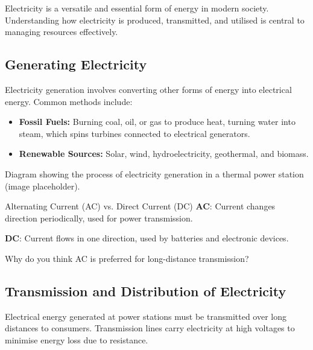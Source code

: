 Electricity is a versatile and essential form of energy in modern society. Understanding how electricity is produced, transmitted, and utilised is central to managing resources effectively.

\subsection{Generating Electricity}

Electricity generation involves converting other forms of energy into electrical energy. Common methods include:

\begin{itemize}
    \item \textbf{Fossil Fuels:} Burning coal, oil, or gas to produce heat, turning water into steam, which spins turbines connected to electrical generators.
    \item \textbf{Renewable Sources:} Solar, wind, hydroelectricity, geothermal, and biomass.
\end{itemize}

\begin{marginfigure}
    \centering
    \caption{Diagram showing the process of electricity generation in a thermal power station (image placeholder).}
\end{marginfigure}

\begin{keyconcept}{Alternating Current (AC) vs. Direct Current (DC)}
\textbf{AC}: Current changes direction periodically, used for power transmission.

\textbf{DC}: Current flows in one direction, used by batteries and electronic devices.
\end{keyconcept}

\begin{stopandthink}
Why do you think AC is preferred for long-distance transmission?
\end{stopandthink}

\subsection{Transmission and Distribution of Electricity}

Electrical energy generated at power stations must be transmitted over long distances to consumers. Transmission lines carry electricity at high voltages to minimise energy loss due to resistance.


